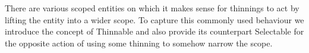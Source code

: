 
There are various scoped entities on which it makes sense for thinnings
to act by lifting the entity into a wider scope. To capture this commonly
used behaviour we introduce the concept of Thinnable and also provide its
counterpart Selectable for the opposite action of using some thinning to
somehow narrow the scope.

